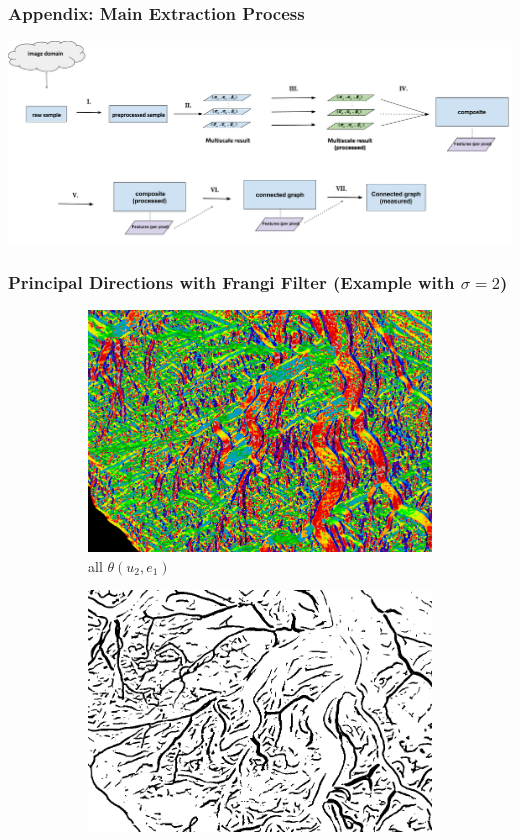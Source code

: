 \documentclass[9pt]{beamer}
\begin{document}
\begin{frame}
	\frametitle{Appendix: Main Extraction Process}
	\includegraphics[width=\textwidth]{main_flowchart}
\end{frame}
\begin{frame}
	\frametitle{Principal Directions with Frangi Filter (Example with  $\sigma=2$)}
	\begin{figure}
		\centering
		\begin{subfigure}[b]{0.30\textwidth}
			\includegraphics[width=\textwidth]{02pdall-inset}
			\caption{all $\theta(u_2 , e_1)$}
		\end{subfigure}
		\begin{subfigure}[b]{0.30\textwidth}
			\includegraphics[width=\textwidth]{02bw-inset}

\end{subfigure}
\end{figure}
\end{frame}
\end{document}
